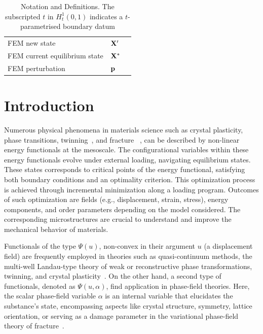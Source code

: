 \documentclass[10pt]{article}
\begin{document}
\begin{table}[h!]
\begin{tabular}{  m{6.5cm}  m{3cm}  m{5cm}  }
        FEM new state                       & $\mathbf{X}'$                                     &                                                                                 \\
        FEM current equilibrium state       & $\mathbf{X^*}$                                 &                                                                                 \\
        FEM perturbation                    & $\mathbf{p}$                                      &                                                                                 \\
    \end{tabular}
    \caption{Notation and Definitions. The subscripted $t$ in $H_t^1(0, 1)$ indicates a $t$-parametrised boundary datum}
    \label{table:notation}
\end{table}


\section{Introduction}
Numerous physical phenomena in materials science such as crystal plasticity, phase transitions, twinning~\cite{Clayton2011-xq}, and fracture ~\cite{francfort_marigo1998,Baldelli2014-ho,Baldelli2021-gc}, can be described by non-linear energy functionals at the mesoscale.
%
%
%
The configurational variables within these energy functionals evolve under external loading, navigating equilibrium states. These states corresponds to critical points of the energy functional, satisfying both boundary conditions and an optimality criterion.
This optimization process is achieved through incremental minimization along a loading program. Outcomes of such optimization are fields
(e.g., displacement, strain, stress), energy components, and order parameters depending on the model considered. The corresponding microstructures are crucial to understand and improve the mechanical behavior of materials.


Functionals of the type $\Psi(u)$, non-convex in their argument  $u$ (a displacement field) are frequently employed in theories such as quasi-continuum methods, the multi-well Landau-type theory of weak or reconstructive phase transformations, twinning, and crystal plasticity~\cite{Tadmor1996-qi,Lookman2003-gd,Conti2004-yj,Finel2010-zw,Clayton2011-xq,Salman2019-cg,Baggio2019-rs,Baggio2023-qu}. On the other hand, a second type of functionals, denoted as $\Psi(u, \alpha)$, find application in phase-field theories. Here, the scalar phase-field variable $\alpha$ is an internal variable that elucidates the substance's state, encompassing aspects like crystal structure, symmetry, lattice orientation, \cite{Finel2010-zw,Ruffini2015-pn,Javanbakht2016-dr} or serving as a damage parameter in the variational phase-field theory of fracture~\cite{francfort_marigo1998,Salman2021-mn}.
\end{document}
